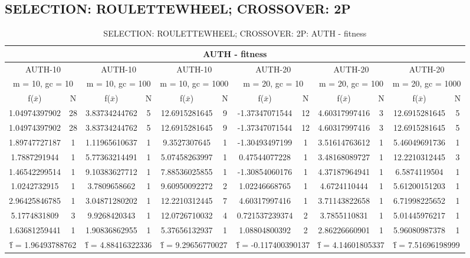 \subsection{SELECTION: ROULETTEWHEEL; CROSSOVER: 2P}
\begin{table}[H]
	\centering
	\caption{SELECTION: ROULETTEWHEEL; CROSSOVER: 2P: AUTH - fitness}
	\begin{adjustbox}{width=1\textwidth}
		\begin{tabular}{ |c|c||c|c||c|c||c|c||c|c||c|c| }
			\hline
			\multicolumn{12}{|c|}{AUTH - fitness} \\
			\hline
			\multicolumn{2}{|c||}{AUTH-10} & \multicolumn{2}{c||}{AUTH-10} & \multicolumn{2}{c||}{AUTH-10} & \multicolumn{2}{c||}{AUTH-20} & \multicolumn{2}{c||}{AUTH-20} & \multicolumn{2}{c|}{AUTH-20}\\
			\hline
			\multicolumn{2}{|c||}{m = 10, gc = 10} & \multicolumn{2}{c||}{m = 10, gc = 100} & \multicolumn{2}{c||}{m = 10, gc = 1000} & \multicolumn{2}{c||}{m = 20, gc = 10} & \multicolumn{2}{c||}{m = 20, gc = 100} & \multicolumn{2}{c|}{m = 20, gc = 1000}\\
			\hline
			f($\bar{x}$) & N & f($\bar{x}$) & N & f($\bar{x}$) & N & f($\bar{x}$) & N & f($\bar{x}$) & N & f($\bar{x}$) & N\\
			\hline
			\hline
			1.04974397902 & 28 & 3.83734244762 & 5 & 12.6915281645 & 9 & -1.37347071544 & 12 & 4.60317997416 & 3 & 12.6915281645 & 5\\
			\hline
			1.04974397902 & 28 & 3.83734244762 & 5 & 12.6915281645 & 9 & -1.37347071544 & 12 & 4.60317997416 & 3 & 12.6915281645 & 5\\
			1.89747727187 & 1 & 1.11965610637 & 1 & 9.3527307645 & 1 & -1.30493497199 & 1 & 3.51614763612 & 1 & 5.46049691736 & 1\\
			1.7887291944 & 1 & 5.77363214491 & 1 & 5.07458263997 & 1 & 0.47544077228 & 1 & 3.48168089727 & 1 & 12.2210312445 & 3\\
			1.46542299514 & 1 & 9.10383627712 & 1 & 7.88536025855 & 1 & -1.30854060176 & 1 & 4.37187964941 & 1 & 6.5874119504 & 1\\
			1.0242732915 & 1 & 3.7809658662 & 1 & 9.60950092272 & 2 & 1.02246668765 & 1 & 4.6724110444 & 1 & 5.61200151203 & 1\\
			2.96425846785 & 1 & 3.04871280202 & 1 & 12.2210312445 & 7 & 4.60317997416 & 1 & 3.71143822658 & 1 & 6.71998225652 & 1\\
			5.1774831809 & 3 & 9.9268420343 & 1 & 12.0726710032 & 4 & 0.721537239374 & 2 & 3.7855110831 & 1 & 5.01445976217 & 1\\
			1.63681259441 & 1 & 1.90836862955 & 1 & 5.37656132937 & 1 & 1.08804800392 & 2 & 2.86226660901 & 1 & 5.96080987378 & 1\\
			\hline
			\multicolumn{2}{|c||}{\^{f} = 1.96493788762} & \multicolumn{2}{c||}{\^{f} = 4.88416322336} & \multicolumn{2}{c||}{\^{f} = 9.29656770027} & \multicolumn{2}{c||}{\^{f} = -0.117400390137} & \multicolumn{2}{c||}{\^{f} = 4.14601805337} & \multicolumn{2}{c|}{\^{f} = 7.51696198999}\\
			\hline
		\end{tabular}
	\end{adjustbox}
\end{table}

